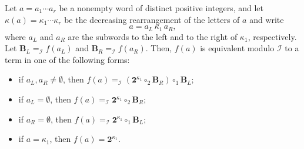 \documentclass[10pt,a4paper]{amsart}
\begin{document}
\begin{lemma}\label{lem:f-word-normalization}
Let \(a=a_1\cdots a_r\) be a nonempty word of distinct positive integers, and
let \(\kappa(a)=\kappa_1\cdots\kappa_r\) be the decreasing rearrangement of the
letters of \(a\) and write
\[
a=a_L\,\kappa_1\,a_R,
\]
where \(a_L\) and \(a_R\) are the subwords to the left and to the right of
\(\kappa_1\), respectively. 
Let $\mathbf B_L =_{\mathcal I} f(a_L)$ and $\mathbf B_R =_{\mathcal I} f(a_R)$. Then, $f(a)$ is equivalent modulo ${\mathcal I}$ to a term in one of the following forms:
\begin{itemize}
    \item [$\cdot$] if $a_L,a_R\neq\emptyset$, then $f(a)=_{\mathcal I}(\mathbf 2^{\kappa_1}\circ_2 \mathbf B_R)\circ_1 \mathbf B_L$;
    \item [$\cdot$] if \(a_L=\emptyset\), then $f(a)=_{\mathcal I}\mathbf 2^{\kappa_1}\circ_2 \mathbf B_R$;
    \item [$\cdot$] if \(a_R=\emptyset\), then $f(a)=_{\mathcal I}\mathbf 2^{\kappa_1}\circ_1 \mathbf B_L$;
    \item [$\cdot$] if \(a=\kappa_1\), then \(f(a)=\mathbf 2^{\kappa_1}\).
\end{itemize}
\end{lemma}
\end{document}
